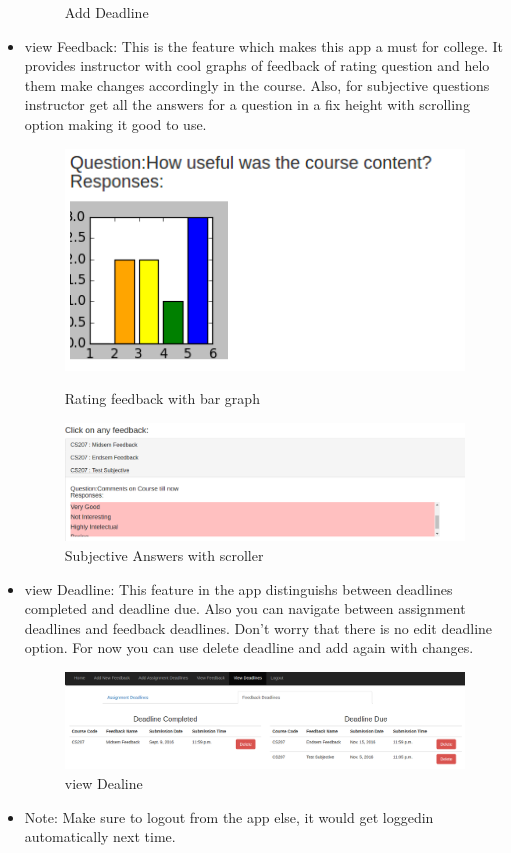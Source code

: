 \documentclass[12pt]{extreport}
\begin{document}
\begin{itemize}
\begin{figure}[ht!]
\begin{minipage}{.5\textwidth}
      \caption{Add Deadline \label{overflow}}
      \label{fig:sub1}
    \end{minipage}%
  \end{figure}
  \item view Feedback: This is the feature which makes this app a must for college. It provides instructor with cool graphs of feedback of rating question and helo them make changes accordingly in the course. Also, for subjective questions instructor get all the answers for a question in a fix height with scrolling option making it good to use.
  \begin{figure}[ht!]
    \centering
    \begin{minipage}{.5\textwidth}
      \centering
      \includegraphics[width=.4\linewidth]{images/ratingAnswer.png}
      \caption{Rating feedback with bar graph\label{overflow}}
      \label{fig:sub1}
    \end{minipage}%
    \begin{minipage}{.5\textwidth}
      \centering
      \includegraphics[width=.4\linewidth]{images/subjectiveAnswers.png}
      \caption{Subjective Answers with scroller \label{overflow}}
      \label{fig:sub1}
    \end{minipage}%
  \end{figure}
  \item view Deadline: This feature in the app distinguishs between deadlines completed and deadline due. Also you can navigate between assignment deadlines and feedback deadlines. Don't worry that there is no edit deadline option. For now you can use delete deadline and add again with changes.
  \begin{figure}[ht!]
    \centering
      \centering
      \includegraphics[width=.4\linewidth]{images/viewDeadline.png}
      \caption{view Dealine\label{overflow}}
      \label{fig:sub1}
  \end{figure}
  \item Note: Make sure to logout from the app else, it would get loggedin automatically next time.

  \end{itemize}
\end{document}
